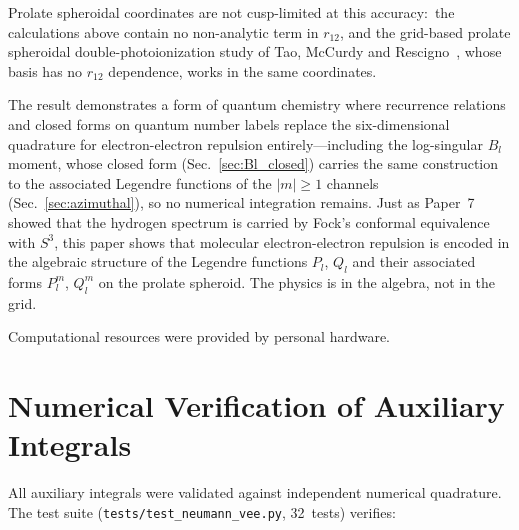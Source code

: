 \documentclass[aps,pra,twocolumn,superscriptaddress,longbibliography]{revtex4-2}
\begin{document}
Prolate spheroidal coordinates are not cusp-limited at this accuracy:\
the calculations above contain no non-analytic term in $r_{12}$, and the
grid-based prolate spheroidal double-photoionization study of Tao,
McCurdy and Rescigno~\cite{tao_mccurdy_rescigno2010}, whose basis has no
$r_{12}$ dependence, works in the same coordinates.

The result demonstrates a form of quantum chemistry where
recurrence relations and closed forms on quantum number labels replace
the six-dimensional quadrature for electron-electron repulsion
entirely---including the log-singular $B_l$ moment, whose closed form
(Sec.~\ref{sec:Bl_closed}) carries the same construction to the
associated Legendre functions of the $|m| \ge 1$ channels
(Sec.~\ref{sec:azimuthal}), so no numerical integration remains.
Just as
Paper~7 showed that the hydrogen spectrum is carried by Fock's
conformal equivalence with $S^3$, this paper shows that molecular
electron-electron repulsion is encoded in the algebraic
structure of the Legendre functions $P_l$, $Q_l$ and their
associated forms $P_l^m$, $Q_l^m$ on the
prolate spheroid.  The physics is in the algebra, not in the
grid.


\begin{acknowledgments}
Computational resources were provided by personal hardware.
\end{acknowledgments}


\appendix

\section{Numerical Verification of Auxiliary Integrals}
\label{app:verification}

All auxiliary integrals were validated against independent
numerical quadrature.  The test suite (\texttt{tests/test\_neumann\_vee.py},
32~tests) verifies:
\end{document}
